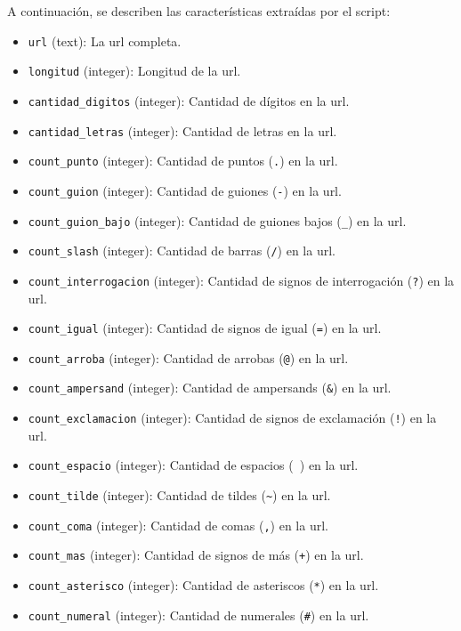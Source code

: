 A continuación, se describen las características extraídas por el \gls{script}:

\begin{itemize}
    \item \texttt{url} (text): La \gls{url} completa.
    \item \texttt{longitud} (integer): Longitud de la \gls{url}.
    \item \texttt{cantidad\_digitos} (integer): Cantidad de dígitos en la \gls{url}.
    \item \texttt{cantidad\_letras} (integer): Cantidad de letras en la \gls{url}.
    \item \texttt{count\_punto} (integer): Cantidad de puntos (\texttt{.}) en la \gls{url}.
    \item \texttt{count\_guion} (integer): Cantidad de guiones (\texttt{-}) en la \gls{url}.
    \item \texttt{count\_guion\_bajo} (integer): Cantidad de guiones bajos (\texttt{\_}) en la \gls{url}.
    \item \texttt{count\_slash} (integer): Cantidad de barras (\texttt{/}) en la \gls{url}.
    \item \texttt{count\_interrogacion} (integer): Cantidad de signos de interrogación (\texttt{?}) en la \gls{url}.
    \item \texttt{count\_igual} (integer): Cantidad de signos de igual (\texttt{=}) en la \gls{url}.
    \item \texttt{count\_arroba} (integer): Cantidad de arrobas (\texttt{@}) en la \gls{url}.
    \item \texttt{count\_ampersand} (integer): Cantidad de ampersands (\texttt{\&}) en la \gls{url}.
    \item \texttt{count\_exclamacion} (integer): Cantidad de signos de exclamación (\texttt{!}) en la \gls{url}.
    \item \texttt{count\_espacio} (integer): Cantidad de espacios (\texttt{ }) en la \gls{url}.
    \item \texttt{count\_tilde} (integer): Cantidad de tildes (\texttt{\textasciitilde}) en la \gls{url}.
    \item \texttt{count\_coma} (integer): Cantidad de comas (\texttt{,}) en la \gls{url}.
    \item \texttt{count\_mas} (integer): Cantidad de signos de más (\texttt{+}) en la \gls{url}.
    \item \texttt{count\_asterisco} (integer): Cantidad de asteriscos (\texttt{*}) en la \gls{url}.
    \item \texttt{count\_numeral} (integer): Cantidad de numerales (\texttt{\#}) en la \gls{url}.

\end{itemize}
